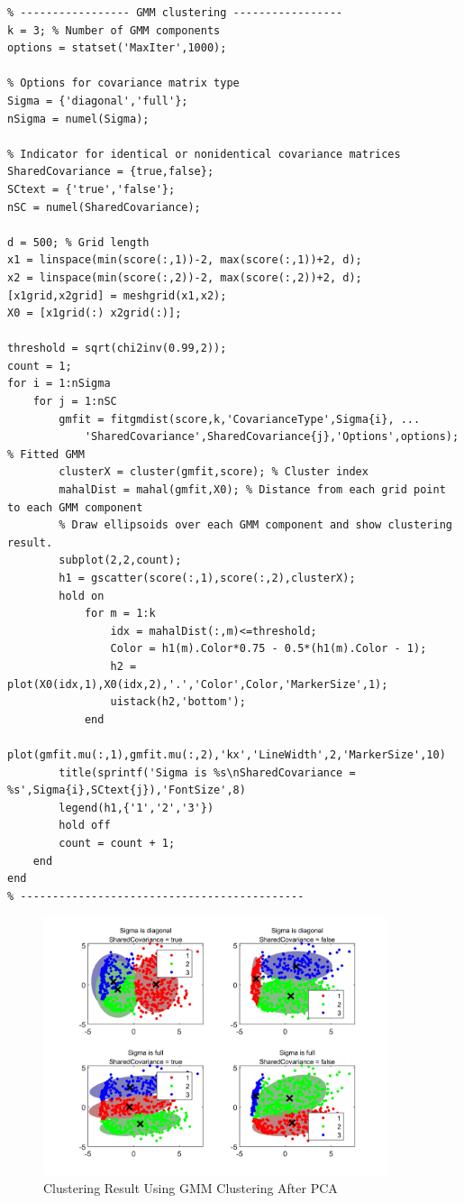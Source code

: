 \documentclass[a4paper,12pt]{article} %
\begin{document}
\begin{footnotesize}
\begin{verbatim}
% ----------------- GMM clustering -----------------
k = 3; % Number of GMM components
options = statset('MaxIter',1000);

% Options for covariance matrix type
Sigma = {'diagonal','full'}; 
nSigma = numel(Sigma);

% Indicator for identical or nonidentical covariance matrices
SharedCovariance = {true,false}; 
SCtext = {'true','false'};
nSC = numel(SharedCovariance);

d = 500; % Grid length
x1 = linspace(min(score(:,1))-2, max(score(:,1))+2, d);
x2 = linspace(min(score(:,2))-2, max(score(:,2))+2, d);
[x1grid,x2grid] = meshgrid(x1,x2);
X0 = [x1grid(:) x2grid(:)];

threshold = sqrt(chi2inv(0.99,2));
count = 1;
for i = 1:nSigma
    for j = 1:nSC
        gmfit = fitgmdist(score,k,'CovarianceType',Sigma{i}, ...
            'SharedCovariance',SharedCovariance{j},'Options',options); % Fitted GMM
        clusterX = cluster(gmfit,score); % Cluster index 
        mahalDist = mahal(gmfit,X0); % Distance from each grid point to each GMM component
        % Draw ellipsoids over each GMM component and show clustering result.
        subplot(2,2,count);
        h1 = gscatter(score(:,1),score(:,2),clusterX);
        hold on
            for m = 1:k
                idx = mahalDist(:,m)<=threshold;
                Color = h1(m).Color*0.75 - 0.5*(h1(m).Color - 1);
                h2 = plot(X0(idx,1),X0(idx,2),'.','Color',Color,'MarkerSize',1);
                uistack(h2,'bottom');
            end    
        plot(gmfit.mu(:,1),gmfit.mu(:,2),'kx','LineWidth',2,'MarkerSize',10)
        title(sprintf('Sigma is %s\nSharedCovariance = %s',Sigma{i},SCtext{j}),'FontSize',8)
        legend(h1,{'1','2','3'})
        hold off
        count = count + 1;
    end
end
% --------------------------------------------
\end{verbatim}
\end{footnotesize}

\begin{figure}[!htbp]
	\centering
	\includegraphics[width=0.9\textwidth]{GMM.jpg}
	\caption{Clustering Result Using GMM Clustering After PCA}
	\label{fig:5}
\end{figure}
\end{document}
